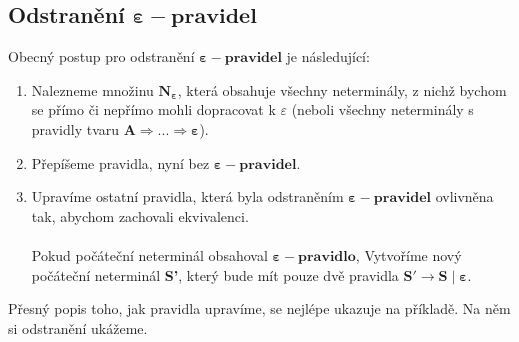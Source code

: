 \documentclass{report}
\begin{document}
\subsection*{Odstranění $\mathbf{\varepsilon-pravidel}$}
Obecný postup pro odstranění $\mathbf{\varepsilon-pravidel}$ je následující:
\begin{enumerate}
    \item Nalezneme množinu $\mathbf{N_{\varepsilon}}$, která obsahuje všechny neterminály, z nichž bychom se přímo či nepřímo mohli dopracovat k $\varepsilon$ (neboli všechny neterminály s pravidly tvaru $\mathbf{A \Rightarrow ... \Rightarrow \varepsilon}$).
    \item Přepíšeme pravidla, nyní bez $\mathbf{\varepsilon-pravidel}$.
    \item Upravíme ostatní pravidla, která byla odstraněním $\mathbf{\varepsilon-pravidel}$ ovlivněna tak, abychom zachovali ekvivalenci.\\ \\ Pokud počáteční neterminál obsahoval $\mathbf{\varepsilon-pravidlo}$, Vytvoříme nový počáteční neterminál \textbf{S'}, který bude mít pouze dvě pravidla $\mathbf{S' \rightarrow S \mid \varepsilon}$.  
\end{enumerate}
Přesný popis toho, jak pravidla upravíme, se nejlépe ukazuje na příkladě. Na něm si odstranění ukážeme.
\end{document}
